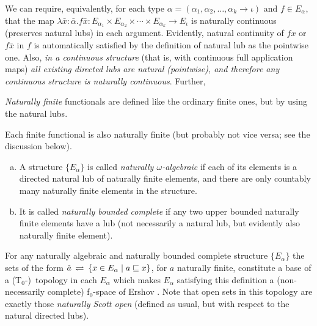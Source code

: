 \documentclass[fleqn]{LMCS}
\theoremstyle{plain}\newtheorem{satz}[thm]{Satz}
\theoremstyle{plain}\newtheorem{hyp}[thm]{Hypothesis}
\theoremstyle{plain}\newtheorem{hyps}[thm]{Hypotheses}
\theoremstyle{definition}\newtheorem{note}[thm]{Note}
\newcommand{\To}{T$_0$}
\newcommand{\fo}{f$_0$}
\newcommand{\setof}[1]{\{#1\}}
\newcommand{\bYdef}{\mathrel{\BYDEF}}
\newcommand{\BYDEF}{\mbox{$\hspace{.2em}\rightleftharpoons\hspace{.2em}$}}
\newcommand{\arr}{\rightarrow}
\newcommand{\bx}{\bar{x}}
\newcommand{\?}{\mbox{?}}
\begin{document}
\noindent
We can require, equivalently, for each type 
$\alpha=(\alpha_1,\alpha_2,\ldots,\alpha_k\arr\iota)$ and 
$f\in E_\alpha$,  
that the map 
$
\lambda \bx:\bar{\alpha}.f\bx:
E_{\alpha_1}\times E_{\alpha_2}\times\cdots\times E_{\alpha_k}\arr E_{\iota}
$
is naturally  {continuous} (preserves natural  lubs) in each argument. 
Evidently, natural  continuity of $fx$ or $f\bx$ in $f$ 
is automatically satisfied by the definition of natural lub as the pointwise one. 
Also, \emph{in a continuous structure} 
(that is, with continuous full application maps)
\emph{all existing directed lubs are natural (pointwise), and therefore 
any continuous structure is naturally continuous}. 
Further, 
\begin{defi}\emph{Naturally finite} functionals 
are defined like the ordinary finite ones, but by using the natural  lubs. 
\end{defi}

\noindent
Each finite functional is also naturally finite 
(but probably not vice versa; see the discussion below). 
\begin{defi}\label{def:alg-bound-compl-struct}\hfill  \begin{enumerate}[(a)]
\item A structure $\setof{E_{\alpha}}$ 
is called \emph{naturally $\omega$-algebraic} if each of its elements 
is a directed natural lub of naturally finite elements, 
and there are only countably many naturally finite elements 
in the structure. 

\item It is called \emph{naturally bounded complete} if any two 
upper bounded 
naturally finite elements 
have a lub (not necessarily a natural lub, but evidently also naturally 
finite element). 
\end{enumerate}
\end{defi}

\noindent
For any naturally algebraic and naturally bounded complete structure $\setof{E_\alpha}$ 
the sets of the form $\check{a}\bYdef\setof{x\in E_\alpha\mid a\sqsubseteq x}$, 
for $a$ naturally finite, constitute a base of a \mbox{(\To-)}~topology in each $E_\alpha$ 
which makes $E_\alpha$ satisfying this definition 
a (non-necessarily complete) \fo-space of Ershov \cite{Ershov72}. 
Note that open sets in this topology are exactly those \emph{naturally Scott open} 
(defined as usual, but with respect to the natural directed lubs). 
\end{document}
